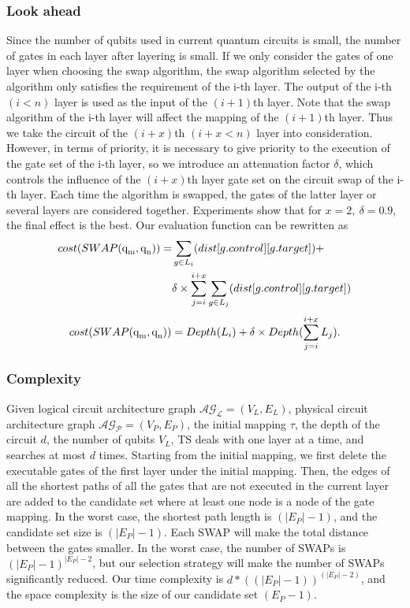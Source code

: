 \documentclass[runningheads]{llncs}
\begin{document}
\subsubsection{Look ahead }
Since the number of qubits used in current quantum circuits is small,  the number of gates in each layer after layering is small. If we only consider the gates of one layer when choosing the swap algorithm, the swap algorithm selected by the algorithm only satisfies the requirement of the i-th layer. The output of the i-th $(i<n)$ layer is used as the input of the $(i+1)$th layer. Note that the swap algorithm of the i-th layer will affect the mapping of the $(i+1)$th layer. Thus we take the circuit of the $(i+x)$th $(i+x< n)$ layer into consideration. However, in terms of priority, it is necessary to give priority to the execution of the gate set of the i-th layer, so we introduce an attenuation factor $\delta$, which controls the influence of the $(i+x)$th layer gate set on the circuit swap of the i-th layer. Each time the algorithm is swapped, the gates of the latter layer or several layers are considered together. Experiments show that for $x=2,\ \delta=0.9$, the final effect is the best. Our evaluation function can be rewritten as
 \begin{equation}
	 	\begin{aligned}
			cost(SWAP(\textup{q}_\textup{m},\textup{q}_\textup{n}))=&\sum_{g \in L_{i}}(dist[g.control][g.target])+\\
	&\delta \times \sum_{j=i}^{i+x}\sum_{g \in L_{j}}(dist[g.control][g.target])
	\label{cost_num}
	\end{aligned}
 \end{equation}
	\begin{equation}
		cost(SWAP(\textup{q}_\textup{m},\textup{q}_\textup{n}))= Depth(L_{i})+\delta \times Depth(\sum_{j=i}^{i+x}L_{j}).
		\label{cost_depth}
		\end{equation}
\subsubsection{Complexity}
Given logical circuit architecture graph  $\mathcal{AG_{L}}=(V_{L},E_{L})$, physical circuit architecture graph $\mathcal{AG_{P}}=(V_{P},E_{P})$, the initial mapping $\tau$, the depth of the circuit $d$, the number of qubits $V_{L}$, TS deals with one layer at a time, and searches at most $d$ times. Starting from the initial mapping, we first delete the executable gates of the first layer under the initial mapping. Then, the edges of all the shortest paths of all the gates that are not executed in the current layer are added to the candidate set where at least one node is a node of the gate mapping. In the worst case, the shortest path length is $(|E_{P}|-1)$, 
and the candidate set size is $(|E_{P}|-1)$. Each SWAP will make the total distance between the gates smaller. In the worst case, the number of SWAPs is $(|E_{P}|-1)^{|E_{P}|-2}$, but our selection strategy will make the number of SWAPs significantly reduced. Our time complexity is $d*((|E_{P}|-1))^{(|E_{P}|-2)}$, and the space complexity is the size of our candidate set $(E_{P}-1)$.
\end{document}

